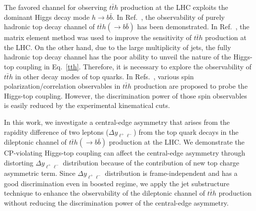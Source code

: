 \documentclass[twocolumn,prd,noshowpacs,nofootinbib,amsmath,amssymb,superscriptaddress,preprintnumbers]{revtex4}
\begin{document}
The favored channel for observing $t\bar{t}h$ production at the LHC exploits the dominant Higgs decay mode $h \to b\bar{b}$. In Ref.~\cite{Buckley:2013auc}, the observability of purely hadronic top decay channel of $t\bar{t}h(\to b\bar{b})$ has been demonstrated. In Ref.~\cite{Artoisenet:2013vfa}, the matrix element method was used to improve the sensitivity of $t\bar{t}h$ production at the LHC. On the other hand, due to the large multiplicity of jets, the fully hadronic top decay channel has the poor ability to unveil the nature of the Higgs-top coupling in Eq.~\ref{tth}. Therefore, it is necessary to explore the observability of $t\bar{t}h$ in other decay modes of top quarks. In Refs.~\cite{Bernreuther:2010ny,Bernreuther:2012sx,Bramante:2014gda,Bernreuther:2015yna,Aguilar-Saavedra:2014kpa,Godbole:2015bda}, various spin polarization/correlation observables in $t\bar{t}h$ production are proposed to probe the Higgs-top coupling. However, the discrimination power of those spin observables is easily reduced by the experimental kinematical cuts.

In this work, we investigate a central-edge asymmetry that arises from the rapidity difference of two leptons ($\Delta y_{\ell^+\ell^-}$) from the top quark decays in the dileptonic channel of $t\bar{t}h(\to b\bar{b})$ production at the LHC. We demonstrate the CP-violating Higgs-top coupling can affect the central-edge asymmetry through distorting $\Delta y_{\ell^+\ell^-}$ distribution because of the contribution of new top charge asymmetric term. Since $\Delta y_{\ell^+\ell^-}$ distribution is frame-independent and has a good discrimination even in boosted regime, we apply the jet substructure technique to enhance the observability of the dileptonic channel of $t\bar{t}h$ production without reducing the discrimination power of the central-edge asymmetry. \\
\end{document}
